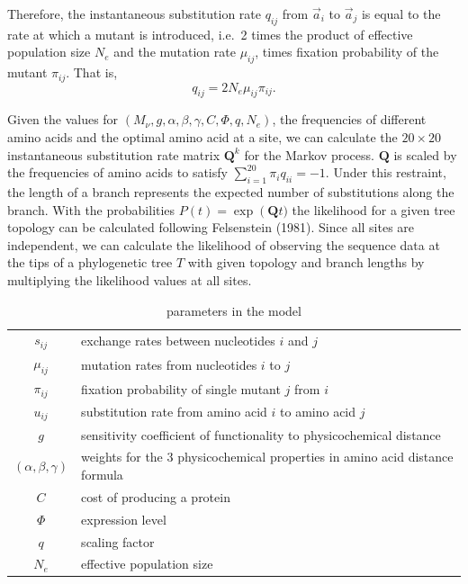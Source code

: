 \documentclass[13pt]{article}
\newcommand{\avec}{\ensuremath{\vec{a}}\xspace}
\newcommand{\Qmat}{\ensuremath{\mathbf{Q}}\xspace}
\begin{document}
Therefore, the instantaneous substitution rate $q_{ij}$ from $\avec_i$ to $\avec_j$ is equal to the rate at which a mutant is introduced, i.e.~2 times the product of effective population size $N_e$ and the mutation rate $\mu_{ij}$, times fixation probability of the mutant $\pi_{ij}$.
That is,
\begin{equation}
q_{ij} = 2N_e \mu_{ij} \pi_{ij}.
\label{eq:subrate}
\end{equation}


Given the values for $\left(M_{\nu},g, \alpha, \beta, \gamma, C, \Phi, q, N_e\right)$, the frequencies of different amino acids and the optimal amino acid at a site, we can calculate the $20 \times 20$ instantaneous substitution rate matrix $\Qmat^k$ for the Markov process. 
$\Qmat$ is scaled by the frequencies of amino acids to satisfy $\sum_{i=1}^{20} \pi_i q_{ii}= -1$.
Under this restraint, the length of a branch represents the expected number of substitutions along the branch.
With the probabilities $P(t)  = \exp\left(\Qmat t)$ the likelihood for a given tree topology can be calculated following Felsenstein (1981).
Since all sites are independent, we can calculate the likelihood of observing the sequence data at the tips of a phylogenetic tree $T$ with given topology and branch lengths by multiplying the likelihood values at all sites.\\

\begin{table}[h]
\centering
\caption{parameters in the model}
\begin{tabular}{ c p{10cm} }
\hline
$s_{ij}$ & exchange rates between nucleotides $i$ and $j$ \\
$\mu_{ij}$ & mutation rates from nucleotides $i$ to $j$\\
$\pi_{ij}$ & fixation probability of single mutant $j$ from $i$\\
$u_{ij}$ & substitution rate from amino acid $i$ to amino acid $j$\\
$g$       & sensitivity coefficient of functionality to physicochemical distance \\
$(\alpha,\beta,\gamma)$ & weights for the 3 physicochemical properties in amino acid distance formula \\
$C$ & cost of producing a protein\\
$\Phi$ & expression level \\
$q$ & scaling factor \\
$N_e$ & effective population size \\
\hline
\end{tabular}

\label{tb: para}
\end{table}
\end{document}
